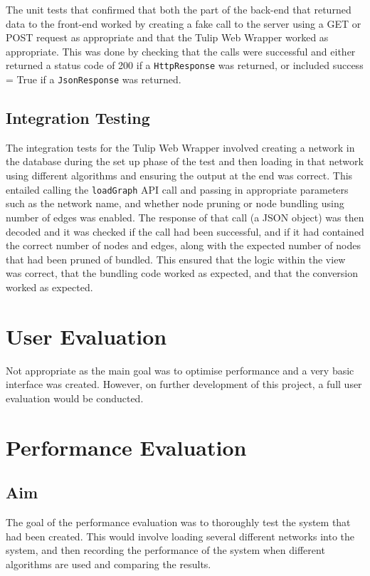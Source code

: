 \documentclass[../dissertation.tex]{subfiles}
\begin{document}
The unit tests that confirmed that both the part of the back-end that returned data to the front-end worked by creating a fake call to the server using a GET or POST request as appropriate and that the Tulip Web Wrapper worked as appropriate. This was done by checking that the calls were successful and either returned a status code of 200 if a \texttt{HttpResponse} was returned, or included success = True if a \texttt{JsonResponse} was returned.

\subsection{Integration Testing}

The integration tests for the Tulip Web Wrapper involved creating a network in the database during the set up phase of the test and then loading in that network using different algorithms and ensuring the output at the end was correct. This entailed calling the \texttt{loadGraph} API call and passing in appropriate parameters such as the network name, and whether node pruning or node bundling using number of edges was enabled. The response of that call (a JSON object) was then decoded and it was checked if the call had been successful, and if it had contained the correct number of nodes and edges, along with the expected number of nodes that had been pruned of bundled. This ensured that the logic within the view was correct, that the bundling code worked as expected, and that the conversion worked as expected.

\section{User Evaluation}

Not appropriate as the main goal was to optimise performance and a very basic interface was created. However, on further development of this project, a full user evaluation would be conducted.

\section{Performance Evaluation}

\subsection{Aim}

The goal of the performance evaluation was to thoroughly test the system that had been created. This would involve loading several different networks into the system, and then recording the performance of the system when different algorithms are used and comparing the results.
\end{document}
